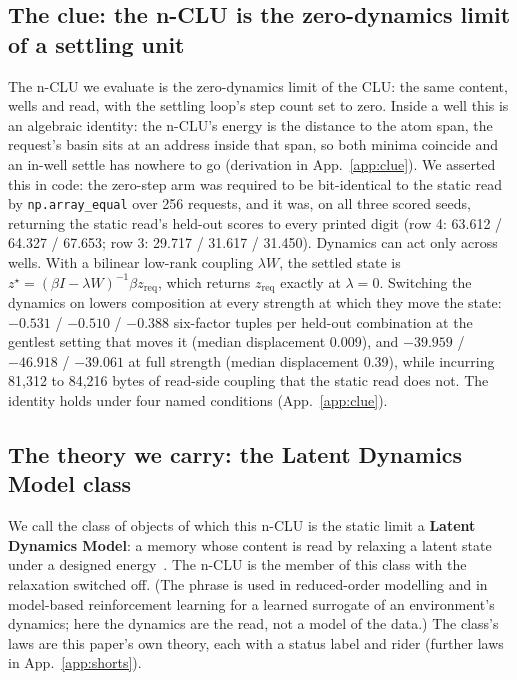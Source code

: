 \documentclass{article} %
\begin{document}
\subsection{The clue: the n-CLU is the zero-dynamics limit of a settling unit}
\label{sec:clue}

The n-CLU we evaluate is the zero-dynamics limit of the CLU: the same content, wells and read,
with the settling loop's step count set to zero. Inside a well this is an algebraic identity: the n-CLU's energy is the distance to the atom span, the request's basin sits at an address inside that span, so both minima coincide and an in-well settle has nowhere
to go (derivation in App.~\ref{app:clue}). We asserted this in code: the zero-step arm was required to be bit-identical to
the static read by \texttt{np.array\_equal} over 256 requests, and it was, on all three scored
seeds, returning the static read's held-out scores to every printed digit (row 4: 63.612 /
64.327 / 67.653; row 3: 29.717 / 31.617 / 31.450). %
Dynamics can act only across wells. With a bilinear low-rank coupling $\lambda W$, the settled
state is $z^\star=(\beta I-\lambda W)^{-1}\beta z_{\text{req}}$, which returns
$z_{\text{req}}$ exactly at $\lambda=0$. Switching the dynamics on lowers composition at every
strength at which they move the state: $-0.531$ / $-0.510$ / $-0.388$ six-factor tuples per
held-out combination at the gentlest setting that moves it (median displacement 0.009), and $-39.959$ /
$-46.918$ / $-39.061$ at full strength (median displacement 0.39), while incurring 81,312 to 84,216 bytes of read-side coupling that the static read does not. %
The identity holds under four named conditions (App.~\ref{app:clue}).

\subsection{The theory we carry: the Latent Dynamics Model class}
\label{sec:theory}

We call the class of objects of which this n-CLU is the static limit a \textbf{Latent Dynamics
Model}: a memory whose content is read by relaxing a latent state under a designed energy~\citep{hopfield1982neural,krotov2016dense,ramsauer2021hopfield,hoover2023energy,kong2024reservoir}. The
n-CLU is the member of this class with the relaxation switched off. (The phrase is used in
reduced-order modelling and in model-based reinforcement learning for a learned surrogate of an
environment's dynamics; here the dynamics are the read, not a model of the data.) The class's laws are this paper's own theory, each with a status label and rider (further laws in
App.~\ref{app:shorts}).
\end{document}
